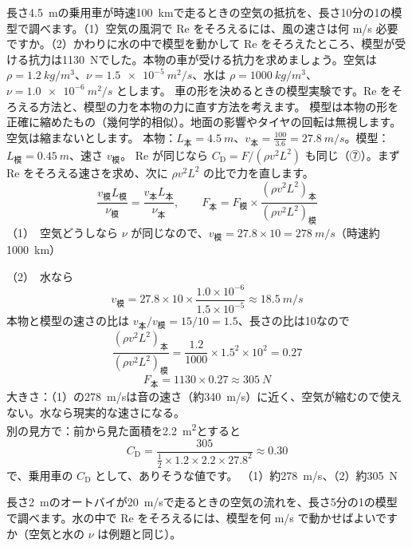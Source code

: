 \begin{phreidai}\label{ph:力-15:ex1}
長さ\qty{4.5}{m}の乗用車が時速\qty{100}{km}で走るときの空気の抵抗を、長さ10分の1の模型で調べます。（1）空気の風洞で Re をそろえるには、風の速さは何 m/s 必要ですか。（2）かわりに水の中で模型を動かして Re をそろえたところ、模型が受ける抗力は\qty{1130}{N}でした。本物の車が受ける抗力を求めましょう。空気は $\rho=\qty{1.2}{kg/m^3}$、$\nu=\qty{1.5e-5}{m^2/s}$、水は $\rho=\qty{1000}{kg/m^3}$、$\nu=\qty{1.0e-6}{m^2/s}$ とします。
\phbamen
車の形を決めるときの模型実験です。Re をそろえる方法と、模型の力を本物の力に直す方法を考えます。
\phmushi
模型は本物の形を正確に縮めたもの（幾何学的相似）。地面の影響やタイヤの回転は無視します。空気は縮まないとします。
\phzu
本物：$L_{\text{本}}=\qty{4.5}{m}$、$v_{\text{本}}=\tfrac{100}{3.6}=\qty{27.8}{m/s}$。模型：$L_{\text{模}}=\qty{0.45}{m}$、速さ $v_{\text{模}}$。
\phriyu
Re が同じなら $C_{\mathrm D}=F/(\rho v^2L^2)$ も同じ（⑦）。まず Re をそろえる速さを求め、次に $\rho v^2L^2$ の比で力を直します。
\phtateru
\[\frac{v_{\text{模}}L_{\text{模}}}{\nu_{\text{模}}}=\frac{v_{\text{本}}L_{\text{本}}}{\nu_{\text{本}}},\qquad F_{\text{本}}=F_{\text{模}}\times\frac{(\rho v^2L^2)_{\text{本}}}{(\rho v^2L^2)_{\text{模}}}\]
\phtoku
（1）\nobreak\ 空気どうしなら $\nu$ が同じなので、$v_{\text{模}}=27.8\times10=\qty{278}{m/s}$（時速約\qty{1000}{km}）\par
（2）\nobreak\ 水なら
\[v_{\text{模}}=27.8\times10\times\frac{1.0\times10^{-6}}{1.5\times10^{-5}}\approx\qty{18.5}{m/s}\]
本物と模型の速さの比は $v_{\text{本}}/v_{\text{模}}=15/10=1.5$、長さの比は10なので
\[\frac{(\rho v^2L^2)_{\text{本}}}{(\rho v^2L^2)_{\text{模}}}=\frac{1.2}{1000}\times1.5^2\times10^2=0.27\]
\[F_{\text{本}}=1130\times0.27\approx\qty{305}{N}\]
\phtashikame
大きさ：（1）の\qty{278}{m/s}は音の速さ（約\qty{340}{m/s}）に近く、空気が縮むので使えない。水なら現実的な速さになる。\\
別の見方で：前から見た面積を\qty{2.2}{m^2}とすると
\[ C_{\mathrm D}=\frac{305}{\frac12\times1.2\times2.2\times27.8^2}\approx0.30 \]
で、乗用車の $C_{\mathrm D}$ として、ありそうな値です。
\kotae （1）約\qty{278}{m/s}、（2）約\qty{305}{N}
\end{phreidai}
\begin{jibun}
長さ\qty{2}{m}のオートバイが\qty{20}{m/s}で走るときの空気の流れを、長さ5分の1の模型で調べます。水の中で Re をそろえるには、模型を何 m/s で動かせばよいですか（空気と水の $\nu$ は例題と同じ）。
\end{jibun}

